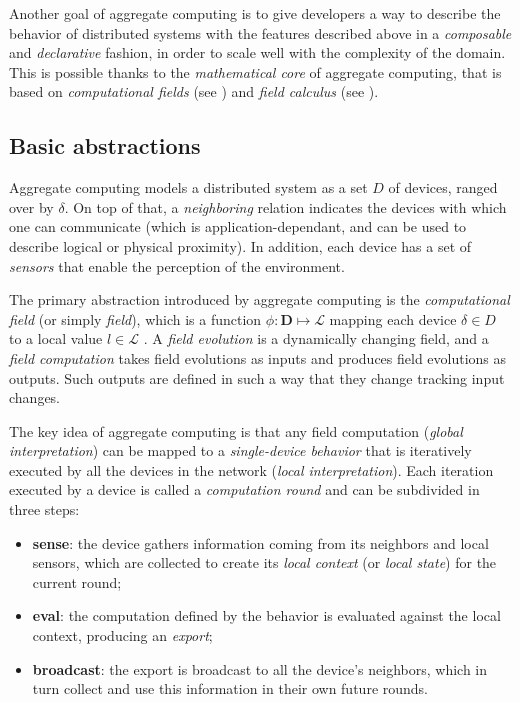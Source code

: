 Another goal of aggregate computing is to give developers a way to describe the behavior of distributed systems with the features described above in a \textit{composable} and \textit{declarative} fashion, in order to scale well with the complexity of the domain.
%
This is possible thanks to the \textit{mathematical core} of aggregate computing, that is based on \textit{computational fields} (see ) and \textit{field calculus} (see ).

\subsection{Basic abstractions}
\label{sec:ac-abstractions}

Aggregate computing models a distributed system as a set $D$ of devices, ranged over by $\delta$.
%
On top of that, a \textit{neighboring} relation indicates the devices with which one can communicate (which is application-dependant, and can be used to describe logical or physical proximity).
%
In addition, each device has a set of \textit{sensors} that enable the perception of the environment.

The primary abstraction introduced by aggregate computing is the \textit{computational field} (or simply \textit{field}), which is a function $\phi : \mathbf{D} \mapsto \mathcal{L}$ mapping each device $\delta \in D$ to a local value $l \in \mathcal{L}$ \cite{10.1145/3177774}.
%
A \textit{field evolution} is a dynamically changing field, and a \textit{field computation} takes field evolutions as inputs and produces field evolutions as outputs.
%
Such outputs are defined in such a way that they change tracking input changes.

The key idea of aggregate computing is that any field computation (\textit{global interpretation}) can be mapped to a \textit{single-device behavior} that is iteratively executed by all the devices in the network (\textit{local interpretation}).
%
Each iteration executed by a device is called a \textit{computation round} and can be subdivided in three steps:
%
\begin{itemize}
    \item \textbf{sense}: the device gathers information coming from its neighbors and local sensors, which are collected to create its \textit{local context} (or \textit{local state}) for the current round;
    \item \textbf{eval}: the computation defined by the behavior is evaluated against the local context, producing an \textit{export};
    \item \textbf{broadcast}: the export is broadcast to all the device's neighbors, which in turn collect and use this information in their own future rounds.
\end{itemize}

